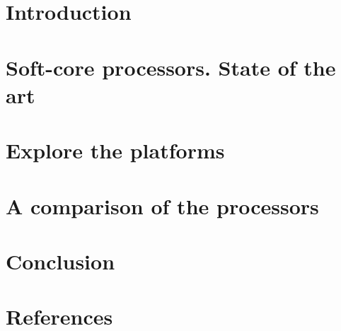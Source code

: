 \documentclass[twoside]{romjist}
\begin{document}
\maketitle




\section{Introduction}



\section{Soft-core processors. State of the art}


\section{Explore the platforms}


\section{A comparison of the processors}


\section{Conclusion}




\section{References}


\end{document}
